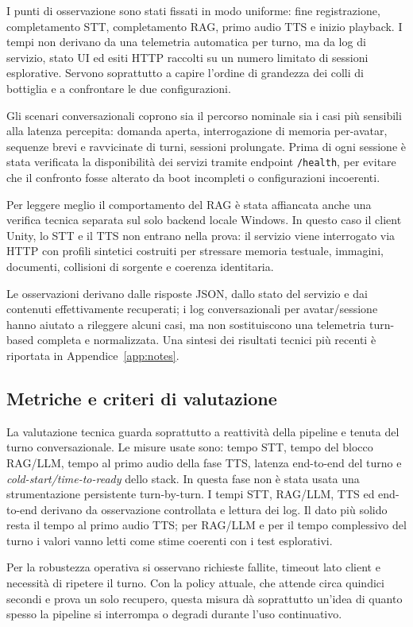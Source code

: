I punti di osservazione sono stati fissati in modo uniforme: fine registrazione, completamento STT, completamento RAG, primo audio TTS e inizio playback. I tempi non derivano da una telemetria automatica per turno, ma da log di servizio, stato UI ed esiti HTTP raccolti su un numero limitato di sessioni esplorative. Servono soprattutto a capire l'ordine di grandezza dei colli di bottiglia e a confrontare le due configurazioni.

Gli scenari conversazionali coprono sia il percorso nominale sia i casi più sensibili alla latenza percepita: domanda aperta, interrogazione di memoria per-avatar, sequenze brevi e ravvicinate di turni, sessioni prolungate. Prima di ogni sessione è stata verificata la disponibilità dei servizi tramite endpoint \texttt{/health}, per evitare che il confronto fosse alterato da boot incompleti o configurazioni incoerenti.

Per leggere meglio il comportamento del RAG è stata affiancata anche una verifica tecnica separata sul solo backend locale Windows. In questo caso il client Unity, lo STT e il TTS non entrano nella prova: il servizio viene interrogato via HTTP con profili sintetici costruiti per stressare memoria testuale, immagini, documenti, collisioni di sorgente e coerenza identitaria.

Le osservazioni derivano dalle risposte JSON, dallo stato del servizio e dai contenuti effettivamente recuperati; i log conversazionali per avatar/sessione hanno aiutato a rileggere alcuni casi, ma non sostituiscono una telemetria turn-based completa e normalizzata. Una sintesi dei risultati tecnici più recenti è riportata in Appendice~\ref{app:notes}.

\subsection{Metriche e criteri di valutazione}
La valutazione tecnica guarda soprattutto a reattività della pipeline e tenuta del turno conversazionale. Le misure usate sono: tempo STT, tempo del blocco RAG/LLM, tempo al primo audio della fase TTS, latenza end-to-end del turno e \emph{cold-start/time-to-ready} dello stack. In questa fase non è stata usata una strumentazione persistente turn-by-turn. I tempi STT, RAG/LLM, TTS ed end-to-end derivano da osservazione controllata e lettura dei log. Il dato più solido resta il tempo al primo audio TTS; per RAG/LLM e per il tempo complessivo del turno i valori vanno letti come stime coerenti con i test esplorativi. {\setlength{\emergencystretch}{5em}\sloppy Per la robustezza operativa si osservano richieste fallite, timeout lato client e necessità di ripetere il turno. Con la policy attuale, che attende circa quindici secondi e prova un solo recupero, questa misura dà soprattutto un'idea di quanto spesso la pipeline si interrompa o degradi durante l'uso continuativo.\par}

